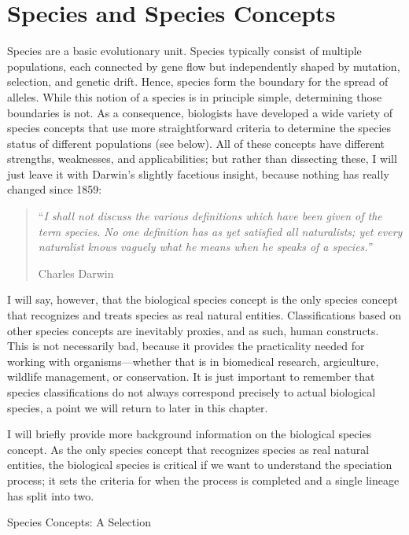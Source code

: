\documentclass[
]{book}
\begin{document}
\hypertarget{species-and-species-concepts}{%
\section{Species and Species Concepts}\label{species-and-species-concepts}}

Species are a basic evolutionary unit. Species typically consist of multiple populations, each connected by gene flow but independently shaped by mutation, selection, and genetic drift. Hence, species form the boundary for the spread of alleles. While this notion of a species is in principle simple, determining those boundaries is not. As a consequence, biologists have developed a wide variety of species concepts that use more straightforward criteria to determine the species status of different populations (see below). All of these concepts have different strengths, weaknesses, and applicabilities; but rather than dissecting these, I will just leave it with Darwin's slightly facetious insight, because nothing has really changed since 1859:

\begin{quote}
``\emph{I shall not discuss the various definitions which have been given of the term species. No one definition has as yet satisfied all naturalists; yet every naturalist knows vaguely what he means when he speaks of a species.''}

Charles Darwin
\end{quote}

I will say, however, that the biological species concept is the only species concept that recognizes and treats species as real natural entities. Classifications based on other species concepts are inevitably proxies, and as such, human constructs. This is not necessarily bad, because it provides the practicality needed for working with organisms---whether that is in biomedical research, argiculture, wildlife management, or conservation. It is just important to remember that species classifications do not always correspond precisely to actual biological species, a point we will return to later in this chapter.

I will briefly provide more background information on the biological species concept. As the only species concept that recognizes species as real natural entities, the biological species is critical if we want to understand the speciation process; it sets the criteria for when the process is completed and a single lineage has split into two.

Species Concepts: A Selection
\end{document}
